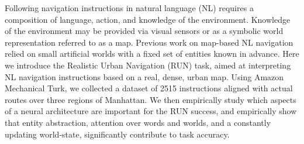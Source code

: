 Following navigation instructions in natural language (NL) requires a composition of language, action, and knowledge of the environment. Knowledge of the environment may be provided via visual sensors or as a symbolic world representation referred to as a map. Previous work on map-based NL navigation relied on small artificial worlds with a fixed set of entities known in advance. Here we introduce the Realistic Urban Navigation (RUN) task, aimed at interpreting NL navigation instructions based on a real, dense, urban map. Using Amazon Mechanical Turk, we collected a dataset of 2515 instructions aligned with actual routes over three regions of Manhattan.
We then empirically study which aspects of a neural architecture are important for the RUN success, and empirically show that entity abstraction,  attention over words and worlds, and a constantly updating world-state, significantly contribute to task accuracy.
